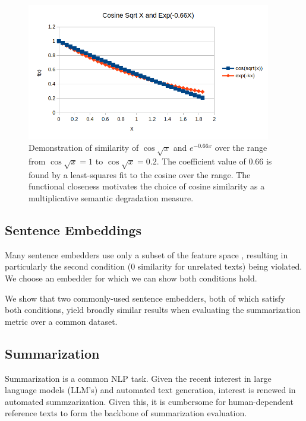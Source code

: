 \documentclass{article}
\newcommand\mycolor{\color{red}\xspace}
\begin{document}
\begin{figure}
	\centering
    \includegraphics[height=6cm]{exp_cos.png}
	\caption{Demonstration of similarity of $\cos \sqrt{x} $ and $e^{-0.66x}$ over the range from $\cos \sqrt{x}=1$ to $\cos \sqrt{x} = 0.2$.  The coefficient value of 0.66 is found by a least-squares fit to the cosine over the range.  The functional closeness motivates the choice of cosine similarity as a multiplicative semantic degradation measure.}
	\label{fig:expcos}
\end{figure}

\subsection{Sentence Embeddings}


Many sentence embedders use only a subset of the feature space \citep{badembeddings}, resulting in particularly the second condition (0 similarity for unrelated texts) being violated.
We choose an embedder for which we can show both conditions hold.

We show that two commonly-used sentence embedders, both of which satisfy both conditions, yield broadly similar results when evaluating the summarization metric over a common dataset.


\subsection{Summarization}

Summarization is a common NLP task. 
Given the recent interest in large language models (LLM's) and automated text generation, interest is renewed in automated summzarization.
Given this, it is cumbersome for human-dependent reference texts to form the backbone of summarization evaluation.
\end{document}
